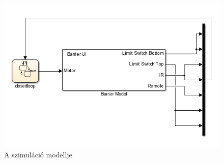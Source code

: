 \begin{figure}
	\centering
	\includegraphics[keepaspectratio]{figures/2m03/b_sim.png}
	\caption{A szimuláció modellje}
	\label{fig:SimModel}
\end{figure}


